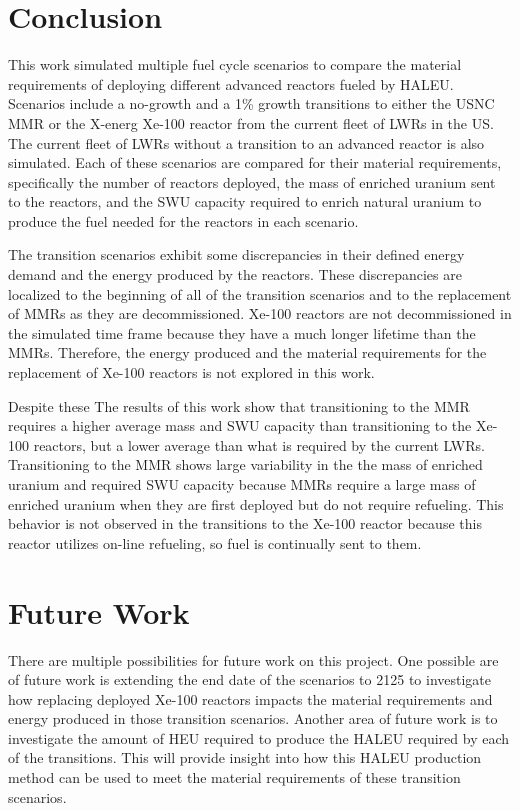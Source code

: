 \section{Conclusion}
This work simulated multiple fuel cycle scenarios to compare the 
material requirements of deploying different advanced reactors fueled 
by \gls{HALEU}. Scenarios include a no-growth and a 1\% growth 
transitions to either the \gls{USNC} \gls{MMR} or the X-energ Xe-100 
reactor from the current fleet of \glspl{LWR} in the US. The current 
fleet of \glspl{LWR} without a transition to an advanced reactor is 
also simulated. Each of these scenarios are compared for their material 
requirements, specifically the number of reactors deployed, the mass 
of enriched uranium sent to the reactors, and the \gls{SWU} capacity 
required to enrich natural uranium to produce the fuel needed for 
the reactors in each scenario. 

The transition scenarios exhibit some discrepancies in their defined 
energy demand and the energy produced by the reactors. These 
discrepancies are localized to the beginning of all of the transition
scenarios and to the replacement of \glspl{MMR} as they are decommissioned. 
Xe-100 reactors are not decommissioned in the simulated time frame because 
they have a much longer lifetime than the \glspl{MMR}. Therefore, the 
energy produced and the material requirements for the replacement of 
Xe-100 reactors is not explored in this work. 

Despite these The results of this work show that transitioning to the \gls{MMR} requires 
a higher average mass and \gls{SWU} capacity than transitioning to the 
Xe-100 reactors, but a lower average than what is required by the current 
\glspl{LWR}. Transitioning to the \gls{MMR} shows large variability in 
the the mass of enriched uranium and required \gls{SWU} capacity because 
\glspl{MMR} require a large mass of enriched uranium when they are 
first deployed but do not require refueling. This behavior is not observed 
in the transitions to the Xe-100 reactor because this reactor utilizes 
on-line refueling, so fuel is continually sent to them. 

\section{Future Work}
There are multiple possibilities for future work on this project. One 
possible are of future work is extending the end date 
of the scenarios to 2125 to investigate how replacing deployed Xe-100 
reactors impacts the material requirements and energy produced in those 
transition scenarios. Another area of future work is to investigate the 
amount of \gls{HEU} required to produce the \gls{HALEU} required by 
each of the transitions. This will provide insight into how this \gls{HALEU}
production method can be used to meet the material requirements of these 
transition scenarios. 
